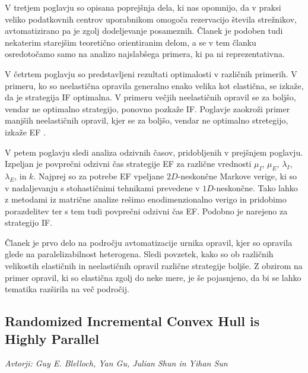 \documentclass[a4paper,11pt]{article}
\begin{document}
V tretjem poglavju so opisana poprejšnja dela, ki nas opomnijo, da v praksi veliko podatkovnih centrov uporabnikom omogoča rezervacijo števila strežnikov, avtomatizirano pa je zgolj dodeljevanje posameznih. 
Članek je podoben tudi nekaterim starejšim teoretično orientiranim delom, a se v tem članku osredotočamo samo na analizo najslabšega primera, ki pa ni reprezentativna.
  
V četrtem poglavju so predstavljeni rezultati optimalosti v različnih primerih. 
V primeru, ko so neelastična opravila generalno enako velika kot elastična, se izkaže, da je strategija IF optimalna. 
V primeru večjih neelastičnih opravil se za boljšo, vendar ne optimalno strategijo, ponovno pozkaže IF. 
Poglavje zaokroži primer manjših neelastičnih opravil, kjer se za boljšo, vendar ne optimalno stretegijo, izkaže EF .
  
V petem poglavju sledi analiza odzivnih časov, pridobljenih v prejšnjem poglavju. 
Izpeljan je povprečni odzivni čas strategije EF za različne vrednosti $\mu_I$, $\mu_E$, $\lambda_I$, $\lambda_E$, in $k$. 
Najprej so za potrebe EF vpeljane $2D$-neskončne Markove verige, ki so v nadaljevanju s stohastičnimi tehnikami prevedene v $1D$-neskončne. 
Tako lahko z metodami iz matrične analize rešimo enodimenzionalno verigo in pridobimo porazdelitev ter s tem tudi povprečni odzivni čas EF. 
Podobno je narejeno za strategijo IF.
  
Članek je prvo delo na področju avtomatizacije urnika opravil, kjer so opravila glede na paralelizabilnost heterogena. 
Sledi povzetek, kako so ob različnih velikostih elastičnih in neelastičnih opravil različne strategije boljše. 
Z obzirom na primer opravil, ki so elastična zgolj do neke mere, je še pojasnjeno, da bi se lahko tematika razširila na več področij.


\subsection{Randomized Incremental Convex Hull is Highly Parallel}

\begin{minipage}{0.35\textwidth}
    \centering
\end{minipage}\hfill
\begin{minipage}{0.65\textwidth}
    \textit{Avtorji: Guy E. Blelloch, Yan Gu, Julian Shun in Yihan Sun}
    \\
\end{minipage}\hfill
\end{document}
